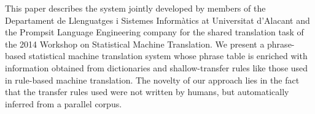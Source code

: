 This paper describes the system jointly developed by members of the Departament de Llenguatges i Sistemes Informàtics at Universitat d'Alacant and the Prompsit Language Engineering company for the shared translation task of the 2014 Workshop on Statistical Machine Translation. We present a phrase-based statistical machine translation system whose phrase table is enriched with information obtained from dictionaries and shallow-transfer rules like those used in rule-based machine translation. The novelty of our approach lies in the fact that the transfer rules used were not written by humans, but automatically inferred from a parallel corpus.
